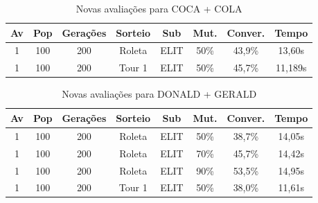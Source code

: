 \documentclass[a4paper, 12pt]{article}
\begin{document}
  \begin{table}[h]
    \centering
    \begin{tabular}{|c|c|c|c|c|c|c|c|}
      \hline
      Av & Pop & Gerações & Sorteio & Sub & Mut. & Conver. & Tempo  \\
      \hline
      1 & 100 & 200 & Roleta & ELIT & 50\% &43,9\% & 13,60s\\
      \hline
      1& 100 & 200 & Tour 1 & ELIT & 50\% &45,7\% & 11,189s\\
      \hline
    \end{tabular}
    \caption{Novas avaliações para COCA + COLA}
    \label{tab:coca}
  \end{table}

  \begin{table}[h]
    \centering
    \begin{tabular}{|c|c|c|c|c|c|c|c|}
      \hline
      Av & Pop & Gerações & Sorteio & Sub & Mut. & Conver. & Tempo  \\
      \hline
      1 & 100 & 200 & Roleta & ELIT & 50\% &38,7\% & 14,05s\\
      \hline
      1 & 100 & 200 & Roleta & ELIT & 70\% &45,7\% & 14,42s\\
      \hline
      1 & 100 & 200 & Roleta & ELIT & 90\% &53,5\% & 14,95s\\
      \hline
      1 & 100 & 200 & Tour 1 & ELIT & 50\% &38,0\% & 11,61s\\
      \hline
    \end{tabular}
    \caption{Novas avaliações para DONALD + GERALD}
    \label{tab:donald}
  \end{table}
\end{document}
